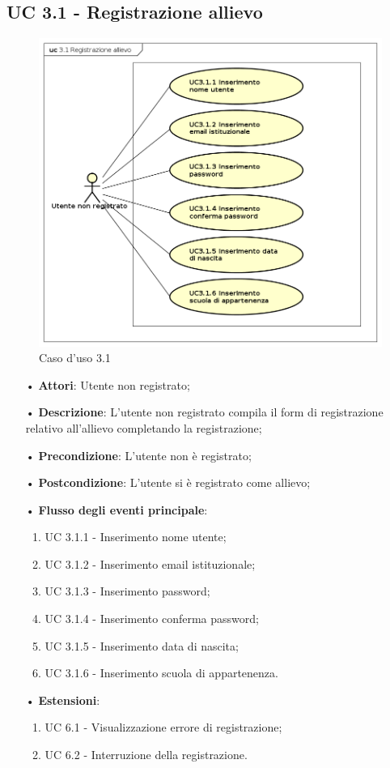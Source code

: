 \subsection{UC 3.1 - Registrazione allievo}
\begin{figure}[H]
\centering
\includegraphics[width=17cm]{img/UC31.png} 
\caption{Caso d'uso 3.1}\label{fig:31}
\end{figure}
\begin{itemize}
\item[•]\textbf{Attori}: Utente non registrato;
\item[•]\textbf{Descrizione}: L’utente non registrato compila il form di registrazione relativo all’allievo completando la registrazione;
\item[•]\textbf{Precondizione}: L’utente non è registrato;
\item[•]\textbf{Postcondizione}: L’utente si è registrato come allievo;
\item[•]\textbf{Flusso degli eventi principale}:
\begin{enumerate}
\item UC 3.1.1 - Inserimento nome utente;
\item UC 3.1.2 - Inserimento email istituzionale;
\item UC 3.1.3 - Inserimento password;
\item UC 3.1.4 - Inserimento conferma password;
\item UC 3.1.5 - Inserimento data di nascita;
\item UC 3.1.6 - Inserimento scuola di appartenenza.
\end{enumerate}
\item[•]\textbf{Estensioni}:
\begin{enumerate}
\item UC 6.1 - Visualizzazione errore di registrazione;
\item UC 6.2 - Interruzione della registrazione.
\end{enumerate}
\end{itemize}

